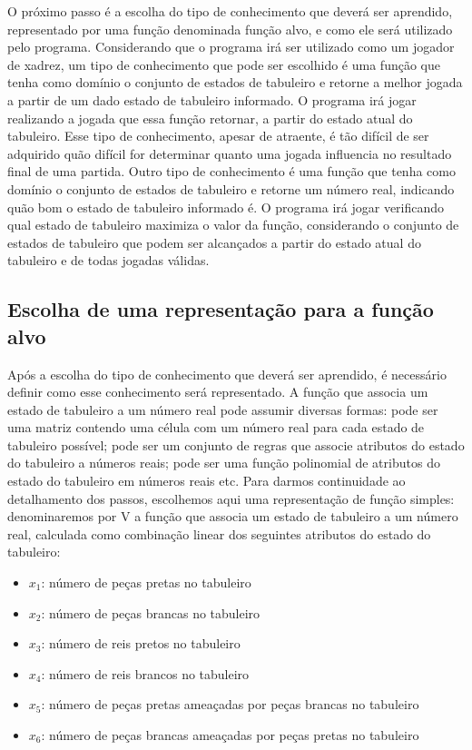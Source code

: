 O próximo passo é a escolha do tipo de conhecimento que deverá ser aprendido, representado por uma função denominada função alvo, e como ele será utilizado pelo programa. Considerando que o programa irá ser utilizado como um jogador de xadrez, um tipo de conhecimento que pode ser escolhido é uma função que tenha como domínio o conjunto de estados de tabuleiro e retorne a melhor jogada a partir de um dado estado de tabuleiro informado. O programa irá jogar realizando a jogada que essa função retornar, a partir do estado atual do tabuleiro. Esse tipo de conhecimento, apesar de atraente, é tão difícil de ser adquirido quão difícil for determinar quanto uma jogada influencia no resultado final de uma partida. Outro tipo de conhecimento é uma função que tenha como domínio o conjunto de estados de tabuleiro e retorne um número real, indicando quão bom o estado de tabuleiro informado é. O programa irá jogar verificando qual estado de tabuleiro maximiza o valor da função, considerando o conjunto de estados de tabuleiro que podem ser alcançados a partir do estado atual do tabuleiro e de todas jogadas válidas.

\subsection*{Escolha de uma representação para a função alvo}

Após a escolha do tipo de conhecimento que deverá ser aprendido, é necessário definir como esse conhecimento será representado. A função que associa um estado de tabuleiro a um número real pode assumir diversas formas: pode ser uma matriz contendo uma célula com um número real para cada estado de tabuleiro possível; pode ser um conjunto de regras que associe atributos do estado do tabuleiro a números reais; pode ser uma função polinomial de atributos do estado do tabuleiro em números reais etc. Para darmos continuidade ao detalhamento dos passos, escolhemos aqui uma representação de função simples: denominaremos por V a função que associa um estado de tabuleiro a um número real, calculada como combinação linear dos seguintes atributos do estado do tabuleiro:

\begin{itemize}
\item $x_1$: número de peças pretas no tabuleiro
\item $x_2$: número de peças brancas no tabuleiro
\item $x_3$: número de reis pretos no tabuleiro
\item $x_4$: número de reis brancos no tabuleiro
\item $x_5$: número de peças pretas ameaçadas por peças brancas no tabuleiro
\item $x_6$: número de peças brancas ameaçadas por peças pretas no tabuleiro
\end{itemize}

